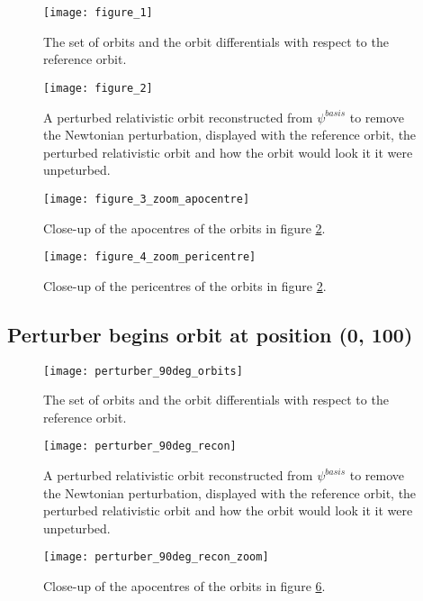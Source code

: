 \documentclass[11pt,a4paper]{article}
\begin{document}
\begin{figure}[htb]
\centerline{\texttt{[image: figure\_1]}}
\caption{The set of orbits and the orbit differentials with respect to the reference orbit. \label{fig:orbs}}
\end{figure}

\begin{figure}[htb]
\centerline{\texttt{[image: figure\_2]}}
\caption{A perturbed relativistic orbit reconstructed from $\psi^{basis}$ to remove the Newtonian perturbation, displayed with the reference orbit, the perturbed relativistic orbit and how the orbit would look it it were unpeturbed. \label{fig:recon}}
\end{figure}

\begin{figure}[htb]
\centerline{\texttt{[image: figure\_3\_zoom\_apocentre]}}
\caption{Close-up of the apocentres of the orbits in figure \ref{fig:recon}. \label{fig:apo}}
\end{figure}

\begin{figure}[htb]
\centerline{\texttt{[image: figure\_4\_zoom\_pericentre]}}
\caption{Close-up of the pericentres of the orbits in figure \ref{fig:recon}. \label{fig:peri}}
\end{figure}
\clearpage{}
\subsection{Perturber begins orbit at position (0, 100)}

\begin{figure}[htb]
\centerline{\texttt{[image: perturber\_90deg\_orbits]}}
\caption{The set of orbits and the orbit differentials with respect to the reference orbit. \label{fig:orbs2}}
\end{figure}

\begin{figure}[htb]
\centerline{\texttt{[image: perturber\_90deg\_recon]}}
\caption{A perturbed relativistic orbit reconstructed from $\psi^{basis}$ to remove the Newtonian perturbation, displayed with the reference orbit, the perturbed relativistic orbit and how the orbit would look it it were unpeturbed. \label{fig:recon2}}
\end{figure}

\begin{figure}[htb]
\centerline{\texttt{[image: perturber\_90deg\_recon\_zoom]}}
\caption{Close-up of the apocentres of the orbits in figure \ref{fig:recon2}. \label{fig:apo2}}
\end{figure}
\end{document}
